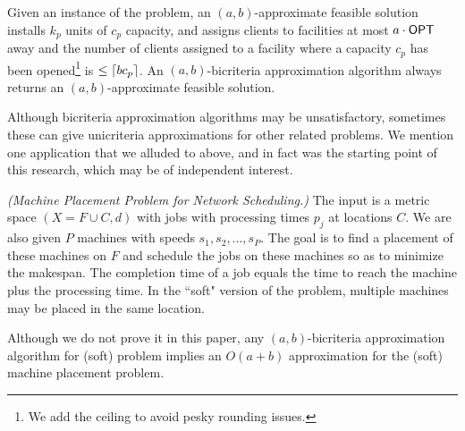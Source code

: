 \begin{definition}
	Given an instance of the \mckc problem, an $(a,b)$-approximate feasible solution installs $k_p$ units of $c_p$ capacity, and
	assigns clients to  facilities at most $a\cdot\mathsf{OPT}$ away and the number of clients assigned to a facility where a capacity
	$c_p$ has been opened\footnote{We add the ceiling to avoid pesky rounding issues.} is $\leq \lceil bc_p\rceil$. An $(a,b)$-bicriteria approximation algorithm always returns an $(a,b)$-approximate feasible solution.
\end{definition}
Although bicriteria approximation algorithms may be unsatisfactory, sometimes these can give unicriteria approximations for other related problems.
We mention one application that  we alluded to above, and in fact was the starting point of this research,  which may be of independent interest.
\begin{definition}\emph{(Machine Placement Problem for Network Scheduling.)}\label{def:mpp}
	The input is a metric space $(X=F\cup C,d)$ with jobs with processing times $p_j$ at locations $C$. We are also given $P$ machines with speeds $s_1,s_2,\ldots,s_P$.
	The goal is to find a placement of these machines on $F$ and schedule the jobs on these machines so as to minimize the makespan. The completion time of a job equals the time to reach the machine plus the processing time. In the ``soft" version of the problem, multiple machines may be placed in the same location.
\end{definition}
Although we do not prove it in this paper, any $(a,b)$-bicriteria approximation algorithm for (soft) \mckc problem implies an $O(a+b)$ approximation for the (soft) machine placement problem.

